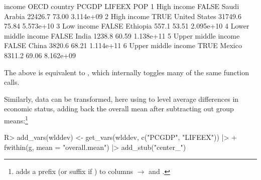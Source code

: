 \documentclass[article]{jss} %
\newcommand{\fct}[1]{\code{#1()}}
\begin{document}
%
\begin{Schunk}
\begin{Soutput}
               income  OECD       country   PCGDP LIFEEX       POP
1         High income FALSE  Saudi Arabia 22426.7  73.00 3.114e+09
2         High income  TRUE United States 31749.6  75.84 5.573e+10
3          Low income FALSE      Ethiopia   557.1  53.51 2.095e+10
4 Lower middle income FALSE         India  1238.8  60.59 1.138e+11
5 Upper middle income FALSE         China  3820.6  68.21 1.114e+11
6 Upper middle income  TRUE        Mexico  8311.2  69.06 8.162e+09
\end{Soutput}
\end{Schunk}
The above is equivalent to , which internally toggles many of the same function calls. \newline

%
%
Similarly, data can be transformed, here using \fct{fwithin} to level average differences in economic status, adding back the overall mean after subtracting out group means:\footnote{\fct{add\_stub} adds a prefix (or suffix if ) to columns $\to$  and .}
%
\begin{Schunk}
\begin{Sinput}
R> add_vars(wlddev) <- get_vars(wlddev, c("PCGDP", "LIFEEX")) |>
+      fwithin(g, mean = "overall.mean") |> add_stub("center_")
\end{Sinput}
\end{Schunk}
%
\end{document}
